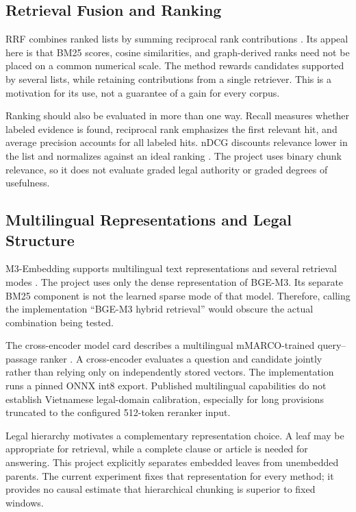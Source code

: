 \documentclass[11pt,a4paper,oneside]{report}
\begin{document}
\subsection{Retrieval Fusion and Ranking}
RRF combines ranked lists by summing reciprocal rank contributions \citep{cormack2009rrf}. Its appeal here is that BM25 scores, cosine similarities, and graph-derived ranks need not be placed on a common numerical scale. The method rewards candidates supported by several lists, while retaining contributions from a single retriever. This is a motivation for its use, not a guarantee of a gain for every corpus.

Ranking should also be evaluated in more than one way. Recall measures whether labeled evidence is found, reciprocal rank emphasizes the first relevant hit, and average precision accounts for all labeled hits. nDCG discounts relevance lower in the list and normalizes against an ideal ranking \citep{jarvelin2002gain}. The project uses binary chunk relevance, so it does not evaluate graded legal authority or graded degrees of usefulness.

\subsection{Multilingual Representations and Legal Structure}
M3-Embedding supports multilingual text representations and several retrieval modes \citep{chen2024m3}. The project uses only the dense representation of BGE-M3. Its separate BM25 component is not the learned sparse mode of that model. Therefore, calling the implementation ``BGE-M3 hybrid retrieval'' would obscure the actual combination being tested.

The cross-encoder model card describes a multilingual mMARCO-trained query--passage ranker \citep{mmarco}. A cross-encoder evaluates a question and candidate jointly rather than relying only on independently stored vectors. The implementation runs a pinned ONNX int8 export. Published multilingual capabilities do not establish Vietnamese legal-domain calibration, especially for long provisions truncated to the configured 512-token reranker input.

Legal hierarchy motivates a complementary representation choice. A leaf may be appropriate for retrieval, while a complete clause or article is needed for answering. This project explicitly separates embedded leaves from unembedded parents. The current experiment fixes that representation for every method; it provides no causal estimate that hierarchical chunking is superior to fixed windows.
\end{document}
